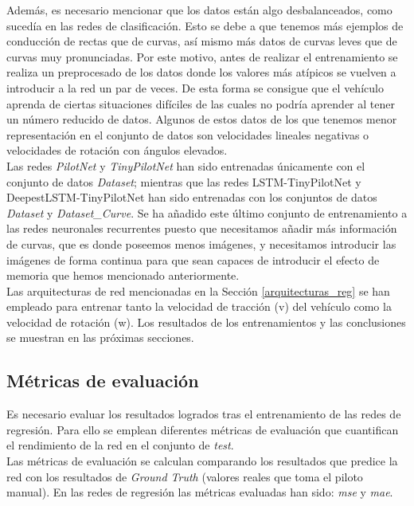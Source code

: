 Además, es necesario mencionar que los datos están algo desbalanceados, como sucedía en las redes de clasificación. Esto se debe a que tenemos más ejemplos de conducción de rectas que de curvas, así mismo más datos de curvas leves que de curvas muy pronunciadas. Por este motivo, antes de realizar el entrenamiento se realiza un preprocesado de los datos donde los valores más atípicos se vuelven a introducir a la red un par de veces. De esta forma se consigue que el vehículo aprenda de ciertas situaciones difíciles de las cuales no podría aprender al tener un número reducido de datos. Algunos de estos datos de los que tenemos menor representación en el conjunto de datos son velocidades lineales negativas o velocidades de rotación con ángulos elevados.\\

Las redes \textit{PilotNet} y \textit{TinyPilotNet} han sido entrenadas únicamente con el conjunto de datos \textit{Dataset}; mientras que las redes LSTM-TinyPilotNet y DeepestLSTM-TinyPilotNet han sido entrenadas con los conjuntos de datos \textit{Dataset} y \textit{Dataset\_Curve}. Se ha añadido este último conjunto de entrenamiento a las redes neuronales recurrentes puesto que necesitamos añadir más información de curvas, que es donde poseemos menos imágenes, y necesitamos introducir las imágenes de forma continua para que sean capaces de introducir el efecto de memoria que hemos mencionado anteriormente.\\

Las arquitecturas de red mencionadas en la Sección \ref{arquitecturas_reg} se han empleado para entrenar tanto la velocidad de tracción (v) del vehículo como la velocidad de rotación (w). Los resultados de los entrenamientos y las conclusiones se muestran en las próximas secciones.\\



\subsection{Métricas de evaluación}\label{metricas_reg}

Es necesario evaluar los resultados logrados tras el entrenamiento de las redes de regresión. Para ello se emplean diferentes métricas de evaluación que cuantifican el rendimiento de la red en el conjunto de \textit{test}.\\

Las métricas de evaluación se calculan comparando los resultados que predice la red con los resultados de \textit{Ground Truth} (valores reales que toma el piloto manual). En las redes de regresión las métricas evaluadas han sido: \textit{\acrfull{mse}} y \textit{\acrfull{mae}}. \\


